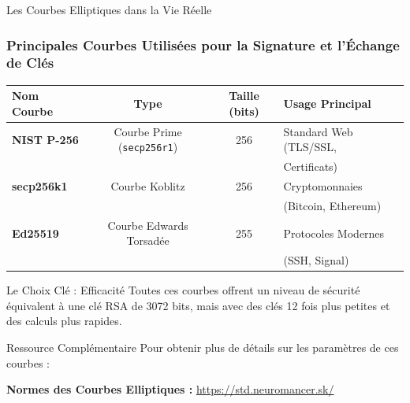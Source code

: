 \begin{frame}{Les Courbes Elliptiques dans la Vie Réelle}
\frametitle{Principales Courbes Utilisées pour la Signature et l'Échange de Clés}

\centering
\begin{tabular}{|l|c|c|l|}
\hline
\textbf{Nom Courbe} & \textbf{Type} & \textbf{Taille (bits)} & \textbf{Usage Principal} \\
\hline
\textbf{NIST P-256} & Courbe Prime (\texttt{secp256r1}) & 256 & Standard Web (TLS/SSL,\\ &&&Certificats) \\
\hline
\textbf{secp256k1} & Courbe Koblitz & 256 & Cryptomonnaies\\ &&&(Bitcoin, Ethereum) \\
\hline
\textbf{Ed25519} & Courbe Edwards Torsadée & 255 & Protocoles Modernes \\&&&(SSH, Signal) \\
\hline
\end{tabular}

\vspace{0.2cm}

\begin{alertblock}{Le Choix Clé : Efficacité}
    Toutes ces courbes offrent un niveau de sécurité équivalent à une clé RSA de 3072 bits, mais avec des clés 12 fois plus petites et des calculs plus rapides.
\end{alertblock}

\vspace{0.2cm}

\begin{exampleblock}{Ressource Complémentaire}
    Pour obtenir plus de détails sur les paramètres de ces courbes :
    
    \centering
    \textbf{Normes des Courbes Elliptiques : } \url{https://std.neuromancer.sk/}
\end{exampleblock}
\end{frame}
